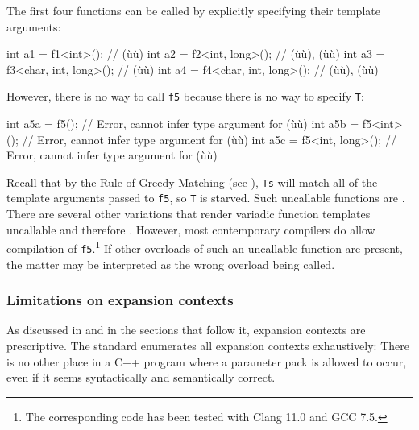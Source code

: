 \noindent The first four functions can be called by explicitly specifying their
template arguments:

\begin{emcppslisting}
int a1 = f1<int>();              // (ù{}ù)
int a2 = f2<int, long>();        // (ù{}ù), (ù{}ù)
int a3 = f3<char, int, long>();  // (ù{}ù)
int a4 = f4<char, int, long>();  // (ù{}ù), (ù{}ù)
\end{emcppslisting}
    

\noindent However, there is no way to call \lstinline!f5! because there is no way to
specify \lstinline!T!:

\begin{emcppslisting}
int a5a = f5();             // Error, cannot infer type argument for (ù{}ù)
int a5b = f5<int>();        // Error, cannot infer type argument for (ù{}ù)
int a5c = f5<int, long>();  // Error, cannot infer type argument for (ù{}ù)
\end{emcppslisting}
    

\noindent Recall that by the Rule of Greedy Matching (see ), \lstinline!Ts! will match all of the template
arguments passed to \lstinline!f5!, so \lstinline!T! is starved. Such
uncallable functions are . There are several other
variations that render variadic function templates uncallable and
therefore . However, most contemporary compilers do allow
compilation of \lstinline!f5!.{\cprotect\footnote{The corresponding code
  has been tested with Clang 11.0 and GCC 7.5.}} If other overloads of
such an uncallable function are present, the matter may be interpreted
as the wrong overload being called.

\subsubsection[Limitations on expansion contexts]{Limitations on expansion contexts}\label{limitations-on-expansion-contexts}

As discussed in  and in the sections
that follow it, expansion contexts are prescriptive. The standard
enumerates all expansion contexts exhaustively: There is no other place
in a C++ program where a parameter pack is allowed to occur, even if it
seems syntactically and semantically correct.

